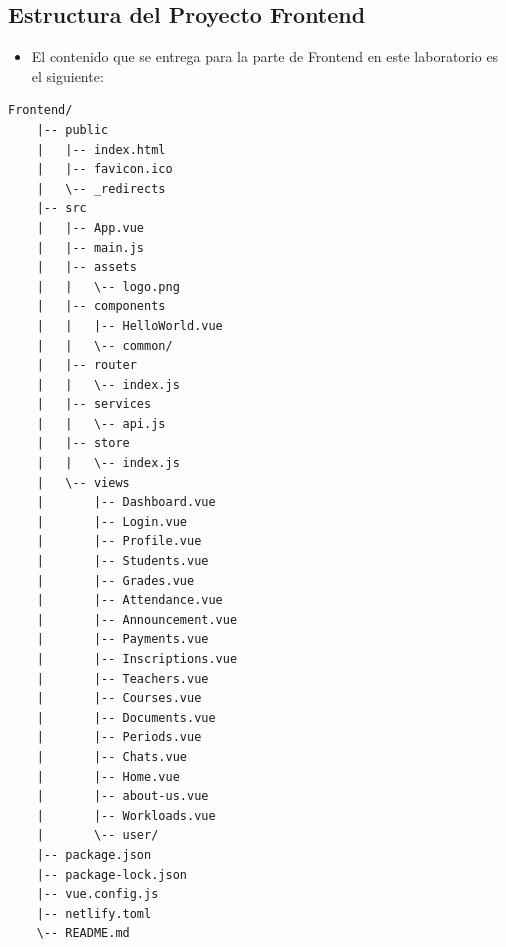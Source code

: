 \documentclass{article}
\begin{document}
    \subsection{Estructura del Proyecto Frontend}
        \begin{itemize}	
            \item El contenido que se entrega para la parte de Frontend en este laboratorio es el siguiente:
        \end{itemize}
            \begin{lstlisting}[style=ascii-tree, numbers=none]
    Frontend/
    |-- public
    |   |-- index.html
    |   |-- favicon.ico
    |   \-- _redirects
    |-- src
    |   |-- App.vue
    |   |-- main.js
    |   |-- assets
    |   |   \-- logo.png
    |   |-- components
    |   |   |-- HelloWorld.vue
    |   |   \-- common/
    |   |-- router
    |   |   \-- index.js
    |   |-- services
    |   |   \-- api.js
    |   |-- store
    |   |   \-- index.js
    |   \-- views
    |       |-- Dashboard.vue
    |       |-- Login.vue
    |       |-- Profile.vue
    |       |-- Students.vue
    |       |-- Grades.vue
    |       |-- Attendance.vue
    |       |-- Announcement.vue
    |       |-- Payments.vue
    |       |-- Inscriptions.vue
    |       |-- Teachers.vue
    |       |-- Courses.vue
    |       |-- Documents.vue
    |       |-- Periods.vue
    |       |-- Chats.vue
    |       |-- Home.vue
    |       |-- about-us.vue
    |       |-- Workloads.vue
    |       \-- user/
    |-- package.json
    |-- package-lock.json
    |-- vue.config.js
    |-- netlify.toml
    \-- README.md
            \end{lstlisting}
\end{document}
